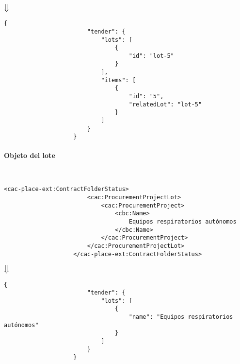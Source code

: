                 \begin{center}
                    $\big\Downarrow$
                \end{center}
                
                \begin{lstlisting}[language=lJSON]
                    {
                        "tender": {
                            "lots": [
                                {
                                    "id": "lot-5"
                                }
                            ],
                            "items": [
                                {
                                    "id": "5",
                                    "relatedLot": "lot-5"
                                }
                            ]
                        }
                    }
                \end{lstlisting}
                
            \paragraph{Objeto del lote} \mbox{}\\
                \begin{lstlisting}[language=lXML]
                    <cac-place-ext:ContractFolderStatus>
                        <cac:ProcurementProjectLot>
                            <cac:ProcurementProject>
                                <cbc:Name>
                                    Equipos respiratorios autónomos
                                </cbc:Name>
                            </cac:ProcurementProject>
                        </cac:ProcurementProjectLot>
                    </cac-place-ext:ContractFolderStatus>
                \end{lstlisting}
                
                \begin{center}
                    $\big\Downarrow$
                \end{center}
                
                \begin{lstlisting}[language=lJSON]
                    {
                        "tender": {
                            "lots": [
                                {
                                    "name": "Equipos respiratorios autónomos"
                                }
                            ]
                        }
                    }
                \end{lstlisting}
                
